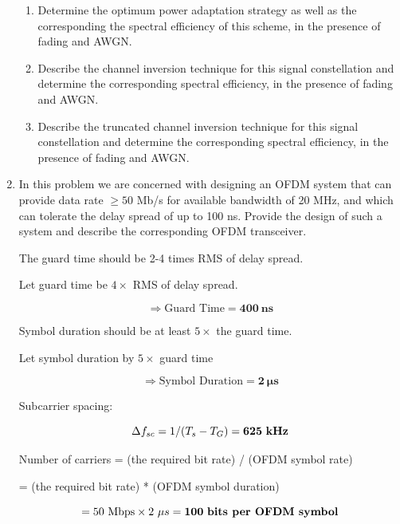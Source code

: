 \documentclass[fleqn]{article}
\begin{document}
\begin{enumerate}
\begin{enumerate}
			\item Determine the optimum power adaptation strategy as well as the corresponding the spectral efficiency of this scheme, in the presence of fading and AWGN.
			
			\item Describe the channel inversion technique for this signal constellation and determine the corresponding spectral efficiency, in the presence of fading and AWGN.
			
			\item Describe the truncated channel inversion technique for this signal constellation and determine the corresponding spectral efficiency, in the presence of fading and AWGN.
		\end{enumerate}
		
		\item In this problem we are concerned with designing an OFDM system that can provide data rate $\geq 50$ Mb/s for available bandwidth of 20 MHz, and which can tolerate the delay spread of up to 100 ns. Provide the design of such a system and describe the corresponding OFDM transceiver.
		
		The guard time should be 2-4 times RMS of delay spread.
		
		Let guard time be $4\times$ RMS of delay spread.
		
		\begin{equation*}
			\Rightarrow \text{Guard Time} = \mathbf{400\ ns}
		\end{equation*}
		
		Symbol duration should be at least $5\times$ the guard time. 
		
		Let symbol duration by $5\times$ guard time
		
		\begin{equation*}
			\Rightarrow \text{Symbol Duration} = \mathbf{2\ \mu{s}}
		\end{equation*}
		
		Subcarrier spacing:
		
		\begin{equation*}
			{\Delta}f_{sc} = 1/(T_s - T_G) = \mathbf{625\ \text{\textbf{kHz}}}
		\end{equation*}
		
		Number of carriers = (the required bit rate) / (OFDM symbol rate)
		
		= (the required bit rate) * (OFDM symbol duration)
		 
		\begin{equation*}
			= 50\ \text{Mbps} \times 2\ {\mu}s = \mathbf{100\ \text{\textbf{bits per OFDM symbol}}}
		\end{equation*}
		

\end{enumerate}
\end{document}
